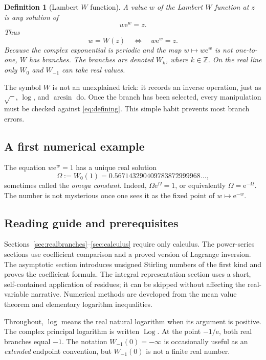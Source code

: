 \documentclass[11pt]{article}
\newtheorem{definition}[theorem]{Definition}
\theoremstyle{remark}
\newcommand{\Wm}{W_{-1}}
\newcommand{\ee}{\mathrm e}
\newcommand{\Log}{\operatorname{Log}}
\begin{document}
\begin{definition}[Lambert \(W\) function]
A value \(w\) of the Lambert \(W\) function at \(z\) is any solution of
\begin{equation}\label{eq:defining}
       w\ee^w=z.
\end{equation}
Thus
\[
       w=W(z)\quad\Longleftrightarrow\quad w\ee^w=z.
\]
Because the complex exponential is periodic and the map \(w\mapsto w\ee^w\)
is not one-to-one, \(W\) has branches.  The branches are denoted \(W_k\),
where \(k\in\mathbb Z\).  On the real line only \(W_0\) and \(W_{-1}\) can
take real values.
\end{definition}

The symbol \(W\) is not an unexplained trick: it records an inverse operation,
just as \(\sqrt{\phantom{x}}\), \(\log\), and \(\arcsin\) do.  Once the branch
has been selected, every manipulation must be checked against
\eqref{eq:defining}.  This simple habit prevents most branch errors.

\subsection{A first numerical example}

The equation \(w\ee^w=1\) has a unique real solution
\[
      \Omega:=W_0(1)=0.567143290409783872999968\ldots,
\]
sometimes called the \emph{omega constant}.  Indeed,
\(\Omega\ee^\Omega=1\), or equivalently \(\Omega=\ee^{-\Omega}\).
The number is not mysterious once one sees it as the fixed point of
\(w\mapsto \ee^{-w}\).

\subsection{Reading guide and prerequisites}

Sections~\ref{sec:realbranches}--\ref{sec:calculus} require only calculus.
The power-series sections use coefficient comparison and a proved version of
Lagrange inversion.  The asymptotic section introduces unsigned Stirling
numbers of the first kind and proves the coefficient formula.  The integral
representation section uses a short, self-contained application of residues;
it can be skipped without affecting the real-variable narrative.  Numerical
methods are developed from the mean value theorem and elementary logarithm
inequalities.

Throughout, \(\log\) means the real natural logarithm when its argument is
positive.  The complex principal logarithm is written \(\Log\).  At the point
\(-1/\ee\), both real branches equal \(-1\).  The notation
\(\Wm(0)=-\infty\) is occasionally useful as an \emph{extended} endpoint
convention, but \(\Wm(0)\) is not a finite real number.
\end{document}
